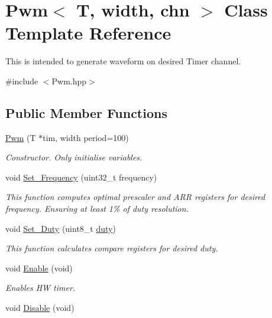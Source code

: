 \hypertarget{class_pwm}{}\section{Pwm$<$ T, width, chn $>$ Class Template Reference}
\label{class_pwm}


This is intended to generate waveform on desired Timer channel.  




{\ttfamily \#include $<$Pwm.\+hpp$>$}

\subsection*{Public Member Functions}
\begin{DoxyCompactItemize}
\item 
\mbox{\hyperlink{class_pwm_a8545359cb048df5d286dd946b78af3a4}{Pwm}} (T $\ast$tim, width period=100)
\begin{DoxyCompactList}\small\item\em Constructor. Only initialise variables. \end{DoxyCompactList}\item 
void \mbox{\hyperlink{class_pwm_a0d63f768270057d153984dec2a64c3e2}{Set\+\_\+\+Frequency}} (uint32\+\_\+t frequency)
\begin{DoxyCompactList}\small\item\em This function computes optimal prescaler and A\+RR registers for desired frequency. Ensuring at least 1\% of duty resolution. \end{DoxyCompactList}\item 
void \mbox{\hyperlink{class_pwm_a00bcd1145b497918ad9bb06e6b8c35e2}{Set\+\_\+\+Duty}} (uint8\+\_\+t \mbox{\hyperlink{class_pwm_af344531820202020c97a8421ed5d5e2a}{duty}})
\begin{DoxyCompactList}\small\item\em This function calculates compare registers for desired duty. \end{DoxyCompactList}\item 
void \mbox{\hyperlink{class_pwm_a2a485a88f3146158b18c5ce918dcdcf4}{Enable}} (void)
\begin{DoxyCompactList}\small\item\em Enables HW timer. \end{DoxyCompactList}\item 
void \mbox{\hyperlink{class_pwm_a0b9dedff1fba850c471de575871ab2e3}{Disable}} (void)

\end{DoxyCompactItemize}
